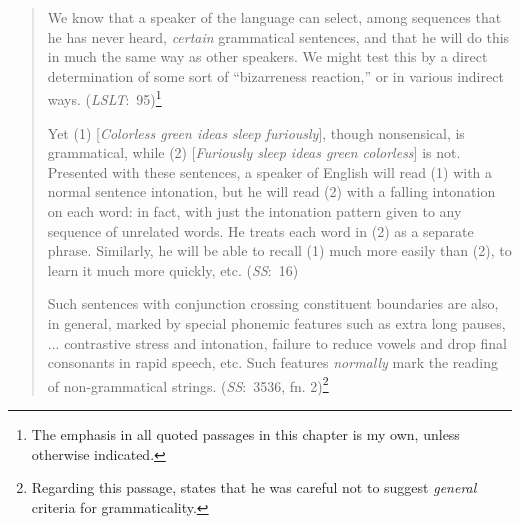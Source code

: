 \begin{quote}
We know that a speaker of the language can select, among sequences that he has never heard,  \textit{certain} grammatical sentences, and that he will do this in much the same way as other speakers. We might test this by a direct determination of some sort of ``bizarreness reaction,'' or in various indirect ways. (\textit{LSLT}:~95)\footnote{The emphasis in all quoted passages in this chapter is my own, unless otherwise indicated.}

Yet (1) [\textit{Colorless green ideas sleep furiously}], though nonsensical, is grammatical, while (2) [\textit{Furiously sleep ideas green colorless}] is not.  Presented with these sentences, a speaker of English will read (1) with a normal sentence intonation, but he will read (2)  with a falling intonation on each word: in fact, with just the intonation pattern given to any sequence of unrelated words. He treats each word in (2)  as a separate phrase. Similarly, he will be able to recall (1) much more easily than (2), to learn it much more quickly, etc. (\textit{SS}:~16)

Such sentences with conjunction crossing constituent boundaries are also, in general, marked by special phonemic features such as extra long pauses, ... contrastive stress and intonation, failure to reduce vowels and drop final consonants in rapid speech, etc. Such features \textit{normally} mark the reading of non-grammatical strings. (\textit{SS}:~35\textendash{}36, fn. 2)\footnote{Regarding this passage, \citet{Chomsky1961} states that he was careful not to suggest \textit{general} criteria for grammaticality.
}

 \end{quote}

